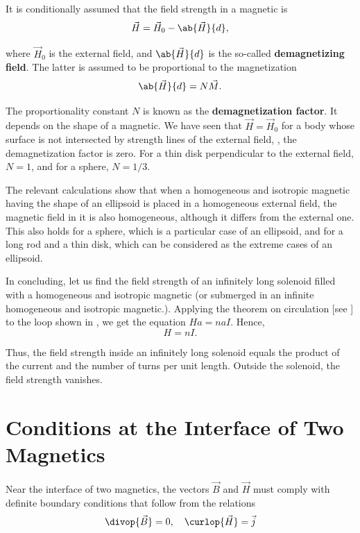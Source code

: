 It is conditionally assumed that the field strength in a magnetic is
\begin{equation}\label{eq:7_27}
    \vec{H} = \vec{H}_0 - \ab{\vec{H}}{d},
\end{equation}

\noindent
where $\vec{H}_0$ is the external field, and $\ab{\vec{H}}{d}$ is the so-called \textbf{demagnetizing field}.
The latter is assumed to be proportional to the magnetization
\begin{equation}\label{eq:7_28}
    \ab{\vec{H}}{d} = N \vec{M}.
\end{equation}

\noindent
The proportionality constant $N$ is known as the \textbf{demagnetization factor}.
It depends on the shape of a magnetic.
We have seen that $\vec{H} = \vec{H}_0$ for a body whose surface is not intersected by strength lines of the external field, \ie, the demagnetization factor is zero.
For a thin disk perpendicular to the external field, $N = 1$, and for a sphere, $N = 1/3$.

The relevant calculations show that when a homogeneous and isotropic magnetic having the shape of an ellipsoid is placed in a homogeneous external field, the magnetic field in it is also homogeneous, although it differs from the external one.
This also holds for a sphere, which is a particular case of an ellipsoid, and for a long rod and a thin disk, which can be considered as the extreme cases of an ellipsoid.

In concluding, let us find the field strength of an infinitely long solenoid filled with a homogeneous and isotropic magnetic (or submerged in an infinite homogeneous and isotropic magnetic.).
Applying the theorem on circulation [see ] to the loop shown in , we get the equation $Ha = naI$.
Hence,
\begin{equation}\label{eq:7_29}
    H = nI.
\end{equation}

\noindent
Thus, the field strength inside an infinitely long solenoid equals the product of the current and the number of turns per unit length.
Outside the solenoid, the field strength vanishes.

\section{Conditions at the Interface of Two Magnetics}\label{sec:7_4}

Near the interface of two magnetics, the vectors $\vec{B}$ and $\vec{H}$ must comply with definite boundary conditions that follow from the relations
\begin{equation}\label{eq:7_30}
    \divop{\vec{B}} = 0,\quad \curlop{\vec{H}} = \vec{j}
\end{equation}

